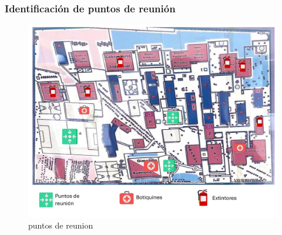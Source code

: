     \subsubsection{Identificación de puntos de reunión}
    \begin{figure}[H]
        \centering
        \includegraphics[scale=0.25]{13/img/localizacionDeRecursos.pdf}
        \caption{puntos de reunion}
        \label{fig:puntos de reunion}
    \end{figure}
